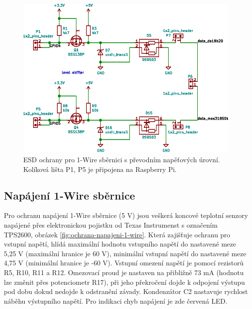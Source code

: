 \begin{figure}[H]
    \centering
    \includegraphics[width=\textwidth]{images/svg/kicad/ochrany-1-wire.eps}
    \caption[ESD ochrany pro 1-Wire sběrnici s převodním napěťových úrovní]{ESD ochrany pro 1-Wire sběrnici s převodním napěťových úrovní. Kolíková lišta P1, P5 je připojena na Raspberry Pi.}
    \label{fig:ochrany-1-wire}
\end{figure}


\subsection{Napájení 1-Wire sběrnice}
\label{napajeni-1-wire-sbernice}
Pro ochranu napájení 1-Wire sběrnice (5 V) jsou veškerá koncové teplotní senzory napájené přes elektronickou pojistku od Texas Instrumenst s označením TPS2600, obrázek \ref{fig:ochrana-napajeni-1-wire}. Která zajišťuje ochranu pro vstupní napětí, hlídá maximální hodnotu vstupního napětí do nastavené meze 5,25 V (maximální hranice je 60 V), minimální vstupní napětí do nastavené meze 4,75 V (minimální hranice je -60 V). Vstupní omezení napětí je pomocí rezistorů R5, R10, R11 a R12. Omezovací proud je nastaven na přibližně 73 mA (hodnotu lze změnit přes potenciometr R17), při jeho překročení dojde k odpojení výstupu pod dobu dokud nedojde k odstranění závady. Kondenzátor C2 nastavuje rychlost náběhu výstupního napětí. Pro indikaci chyb napájení je zde červená LED.

